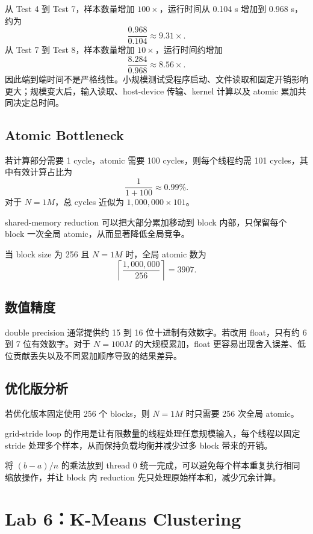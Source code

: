 \documentclass[UTF8,a4paper,12pt,fontset=none]{ctexart}
\begin{document}
从 Test 4 到 Test 7，样本数量增加 $100\times$，运行时间从 0.104 s 增加到 0.968 s，约为
\[
  \frac{0.968}{0.104}\approx9.31\times.
\]
从 Test 7 到 Test 8，样本数量增加 $10\times$，运行时间约增加
\[
  \frac{8.284}{0.968}\approx8.56\times.
\]
因此端到端时间不是严格线性。小规模测试受程序启动、文件读取和固定开销影响更大；规模变大后，输入读取、host-device 传输、kernel 计算以及 atomic 累加共同决定总时间。

\subsection{Atomic Bottleneck}

若计算部分需要 1 cycle，atomic 需要 100 cycles，则每个线程约需 101 cycles，其中有效计算占比为
\[
  \frac{1}{1+100}\approx0.99\%.
\]
对于 $N=1M$，总 cycles 近似为 $1,000,000\times101$。

shared-memory reduction 可以把大部分累加移动到 block 内部，只保留每个 block 一次全局 atomic，从而显著降低全局竞争。

当 block size 为 256 且 $N=1M$ 时，全局 atomic 数为
\[
  \left\lceil\frac{1,000,000}{256}\right\rceil=3907.
\]

\subsection{数值精度}

double precision 通常提供约 15 到 16 位十进制有效数字。若改用 float，只有约 6 到 7 位有效数字。对于 $N=100M$ 的大规模累加，float 更容易出现舍入误差、低位贡献丢失以及不同累加顺序导致的结果差异。

\subsection{优化版分析}

若优化版本固定使用 256 个 blocks，则 $N=1M$ 时只需要 256 次全局 atomic。

grid-stride loop 的作用是让有限数量的线程处理任意规模输入，每个线程以固定 stride 处理多个样本，从而保持负载均衡并减少过多 block 带来的开销。

将 $(b-a)/n$ 的乘法放到 thread 0 统一完成，可以避免每个样本重复执行相同缩放操作，并让 block 内 reduction 先只处理原始样本和，减少冗余计算。

\section{Lab 6：K-Means Clustering}
\end{document}

